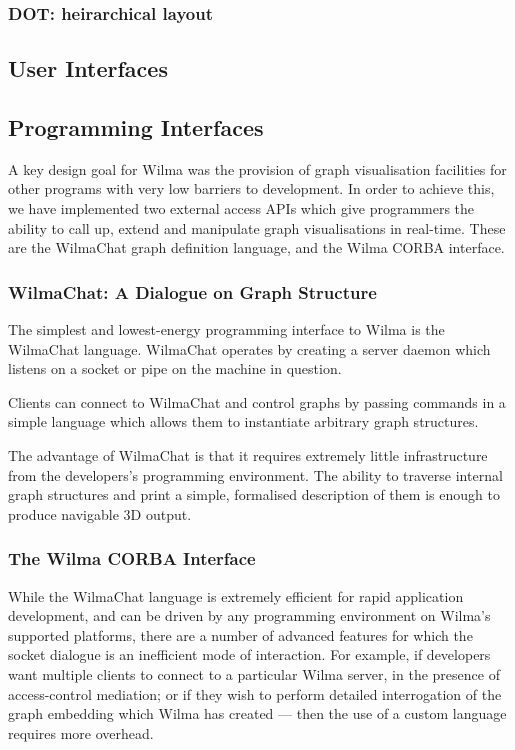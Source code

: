 \documentclass[runningheads]{cl2emult}
\begin{document}
\subsubsection{DOT: heirarchical layout}
\subsection{User Interfaces}
\subsection{Programming Interfaces}
\label{API}

A key design goal for Wilma was the provision of graph visualisation
facilities for other programs with very low barriers to development.  In order
to achieve this, we have implemented two external access APIs which give
programmers the ability to call up, extend and manipulate graph visualisations
in real-time.  These are the WilmaChat graph definition language, and the
Wilma CORBA interface.

\subsubsection{WilmaChat: A Dialogue on Graph Structure}

The simplest and lowest-energy programming interface to Wilma is the WilmaChat
language.  WilmaChat operates by creating a server daemon which listens on a
socket or pipe on the machine in question.

Clients can connect to WilmaChat and control graphs by passing commands
in a simple language which allows them to instantiate arbitrary graph
structures.

The advantage of WilmaChat is that it requires extremely little infrastructure
from the developers's programming environment.  The ability to traverse
internal graph structures and print a simple, formalised description of them
is enough to produce navigable 3D output.

\subsubsection{The Wilma CORBA Interface}

While the WilmaChat language is extremely efficient for rapid application
development, and can be driven by any programming environment on Wilma's
supported platforms, there are a number of advanced features for which the
socket dialogue is an inefficient mode of interaction.  For example, if
developers want multiple clients to connect to a particular Wilma server, in
the presence of access-control mediation; or if they wish to perform detailed
interrogation of the graph embedding which Wilma has created --- then the use
of a custom language requires more overhead.
\end{document}
